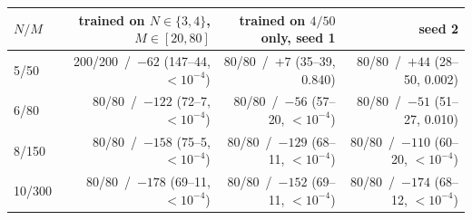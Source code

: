 \begin{tabular}{lrrr}
\toprule
$N/M$ & trained on $N\in\{3,4\}$, $M\in[20,80]$ & trained on $4/50$ only, seed 1 & seed 2 \\
\midrule
5/50 & 200/200 \,/\, $-62$ (147--44, $<10^{-4}$) & 80/80 \,/\, $+7$ (35--39, 0.840) & 80/80 \,/\, $+44$ (28--50, 0.002) \\
6/80 & 80/80 \,/\, $-122$ (72--7, $<10^{-4}$) & 80/80 \,/\, $-56$ (57--20, $<10^{-4}$) & 80/80 \,/\, $-51$ (51--27, 0.010) \\
8/150 & 80/80 \,/\, $-158$ (75--5, $<10^{-4}$) & 80/80 \,/\, $-129$ (68--11, $<10^{-4}$) & 80/80 \,/\, $-110$ (60--20, $<10^{-4}$) \\
10/300 & 80/80 \,/\, $-178$ (69--11, $<10^{-4}$) & 80/80 \,/\, $-152$ (69--11, $<10^{-4}$) & 80/80 \,/\, $-174$ (68--12, $<10^{-4}$) \\
\bottomrule
\end{tabular}%
